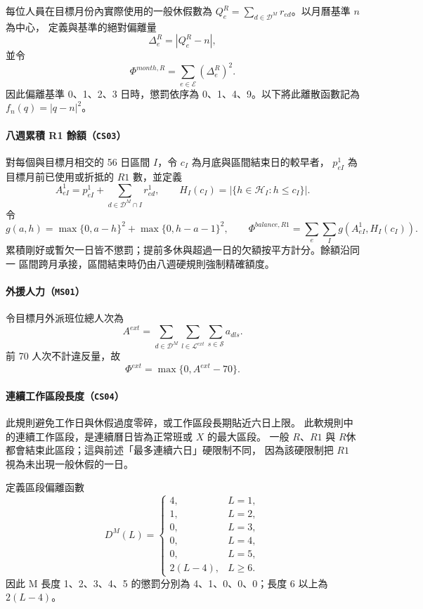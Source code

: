 \documentclass[12pt]{article}
\begin{document}
每位人員在目標月份內實際使用的一般休假數為
\(Q^R_e=\sum_{d\in\mathcal{D}^{M}}r_{ed}\)。以月曆基準 \(n\) 為中心，
定義與基準的絕對偏離量
\[
  \Delta^R_e=|Q^R_e-n|,
\]
並令
\[
  \Phi^{month,R}=\sum_{e\in\mathcal{E}}(\Delta^R_e)^2.
\]
因此偏離基準 0、1、2、3 日時，懲罰依序為 0、1、4、9。以下將此離散函數記為
\(f_n(q)=|q-n|^2\)。

\paragraph{八週累積 R1 餘額（\texttt{CS03}）}

對每個與目標月相交的 56 日區間 \(I\)，令 \(c_I\) 為月底與區間結束日的較早者，
\(p^1_{eI}\) 為目標月前已使用或折抵的 \(R1\) 數，並定義
\[
  A^1_{eI}=p^1_{eI}+\sum_{d\in\mathcal D^M\cap I}r^1_{ed},
  \qquad H_I(c_I)=|\{h\in\mathcal H_I:h\le c_I\}|.
\]
令
\[
  g(a,h)=\max\{0,a-h\}^2+\max\{0,h-a-1\}^2,
  \qquad
  \Phi^{balance,R1}=\sum_e\sum_I g(A^1_{eI},H_I(c_I)).
\]
累積剛好或暫欠一日皆不懲罰；提前多休與超過一日的欠額按平方計分。餘額沿同一
區間跨月承接，區間結束時仍由八週硬規則強制精確額度。

\paragraph{外援人力（\texttt{MS01}）}

令目標月外派班位總人次為
\[
  A^{ext}
  =
  \sum_{d\in\mathcal{D}^{M}}
  \sum_{l\in\mathcal{L}^{ext}}
  \sum_{s\in\mathcal{S}}a_{dls}.
\]
前 70 人次不計違反量，故
\[
  \Phi^{ext}=\max\{0,A^{ext}-70\}.
\]

\paragraph{連續工作區段長度（\texttt{CS04}）}
此規則避免工作日與休假過度零碎，或工作區段長期貼近六日上限。
此軟規則中的連續工作區段，是連續曆日皆為正常班或 \(X\) 的最大區段。
一般 \(R\)、\(R1\) 與 \(R休\) 都會結束此區段；這與前述「最多連續六日」硬限制不同，
因為該硬限制把 \(R1\) 視為未出現一般休假的一日。

定義區段偏離函數
\[
  D^M(L)
  =
  \begin{cases}
    4, & L=1,\\
    1, & L=2,\\
    0, & L=3,\\
    0, & L=4,\\
    0, & L=5,\\
    2(L-4), & L\geq 6.
  \end{cases}
\]
因此 M 長度 1、2、3、4、5 的懲罰分別為 4、1、0、0、0；長度 6 以上為 \(2(L-4)\)。
\end{document}

